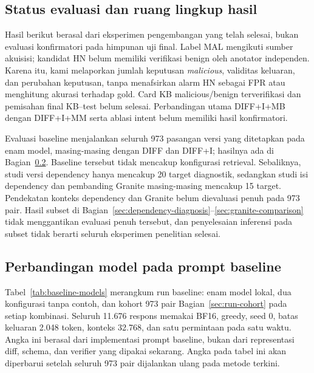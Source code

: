 \subsection{Status evaluasi dan ruang lingkup hasil}
\label{sec:exploratory-status}

Hasil berikut berasal dari eksperimen pengembangan yang telah selesai,
bukan evaluasi konfirmatori pada himpunan uji final. Label MAL mengikuti
sumber akuisisi; kandidat HN belum memiliki verifikasi benign oleh anotator
independen. Karena itu, kami melaporkan jumlah keputusan \emph{malicious},
validitas keluaran, dan perubahan keputusan, tanpa menafsirkan alarm HN
sebagai FPR atau menghitung akurasi terhadap gold. Card KB malicious/benign
terverifikasi dan pemisahan final KB--test belum selesai. Perbandingan utama
DIFF+I+MB dengan DIFF+I+MM serta ablasi intent belum memiliki hasil
konfirmatori.

Evaluasi baseline menjalankan seluruh 973 pasangan versi yang ditetapkan pada
enam model, masing-masing dengan DIFF dan DIFF+I; hasilnya ada di
Bagian~\ref{sec:baseline-models}. Baseline tersebut tidak mencakup konfigurasi
retrieval. Sebaliknya, studi versi dependency hanya mencakup 20 target
diagnostik, sedangkan studi isi dependency dan pembanding Granite
masing-masing mencakup 15 target. Pendekatan konteks dependency dan Granite
belum dievaluasi penuh pada 973 pair. Hasil subset di
Bagian~\ref{sec:dependency-diagnosis}--\ref{sec:granite-comparison} tidak
menggantikan evaluasi penuh tersebut, dan penyelesaian inferensi pada subset
tidak berarti seluruh eksperimen penelitian selesai.

\subsection{Perbandingan model pada prompt baseline}
\label{sec:baseline-models}

Tabel~\ref{tab:baseline-models} merangkum run baseline: enam model lokal,
dua konfigurasi tanpa contoh, dan kohort 973 pair Bagian~\ref{sec:run-cohort}
pada setiap kombinasi.
Seluruh 11.676 respons memakai BF16, greedy, seed 0, batas keluaran 2.048
token, konteks 32.768, dan satu permintaan pada satu waktu. Angka ini berasal
dari implementasi prompt baseline, bukan dari representasi diff, schema, dan
verifier yang dipakai sekarang. Angka pada tabel ini akan diperbarui setelah
seluruh 973 pair dijalankan ulang pada metode terkini.


